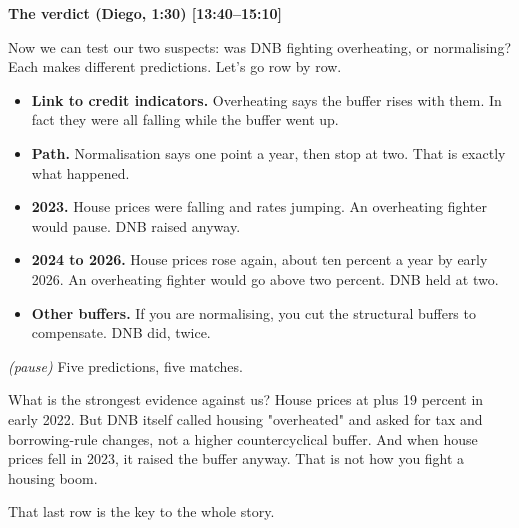 {\small\textbf{The verdict (Diego, 1:30) [13:40–15:10]}}\par\smallskip
Now we can test our two suspects: was DNB fighting overheating, or normalising? Each makes different predictions. Let's go row by row.
\begin{itemize}\setlength\itemsep{0pt}
\item \textbf{Link to credit indicators.} Overheating says the buffer rises with them. In fact they were all falling while the buffer went up.
\item \textbf{Path.} Normalisation says one point a year, then stop at two. That is exactly what happened.
\item \textbf{2023.} House prices were falling and rates jumping. An overheating fighter would pause. DNB raised anyway.
\item \textbf{2024 to 2026.} House prices rose again, about ten percent a year by early 2026. An overheating fighter would go above two percent. DNB held at two.
\item \textbf{Other buffers.} If you are normalising, you cut the structural buffers to compensate. DNB did, twice.
\end{itemize}
\par\smallskip
\emph{(pause)} Five predictions, five matches.
\par\smallskip
What is the strongest evidence against us? House prices at plus 19 percent in early 2022. But DNB itself called housing "overheated" and asked for tax and borrowing-rule changes, not a higher countercyclical buffer. And when house prices fell in 2023, it raised the buffer anyway. That is not how you fight a housing boom.
\par\smallskip
That last row is the key to the whole story.

